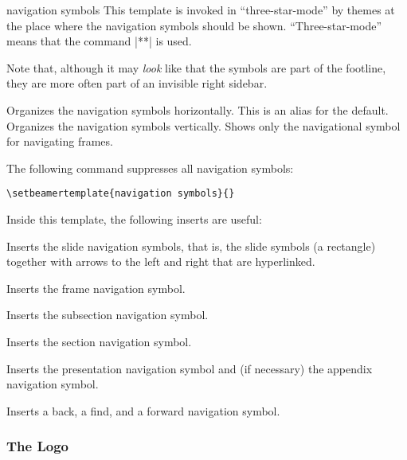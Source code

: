 \begin{element}{navigation symbols}\yes\yes\yes
  This template is invoked in ``three-star-mode'' by themes
  at the place where the navigation symbols should be
  shown. ``Three-star-mode'' means that the command
  |\usebeamertemplate***| is used.

  Note that, although it may \emph{look} like that the symbols are part of
  the footline, they are more often part of an invisible right
  sidebar.

  \begin{templateoptions}
    Organizes the navigation symbols horizontally.
    This is an alias for the default.
    Organizes the navigation symbols vertically.
    Shows only the navigational symbol for navigating frames.
  \end{templateoptions}

  \example The following command suppresses all navigation symbols:
\begin{verbatim}
\setbeamertemplate{navigation symbols}{}
\end{verbatim}

  Inside this template, the following inserts are useful:
  \begin{itemize}
    \iteminsert{\insertslidenavigationsymbol}
    Inserts the slide navigation symbols, that is, the slide symbols
    (a rectangle) together with arrows to the left and right that are
    hyperlinked.

    \iteminsert{\insertframenavigationsymbol}
    Inserts the frame navigation symbol.

    \iteminsert{\insertsubsectionnavigationsymbol}
    Inserts the subsection navigation symbol.

    \iteminsert{\insertsectionnavigationsymbol}
    Inserts the section navigation symbol.

    \iteminsert{\insertdocnavigationsymbol}
    Inserts the presentation navigation symbol and (if necessary) the
    appendix navigation symbol.

    \iteminsert{\insertbackfindforwardnavigationsymbol}
    Inserts a back, a find, and a forward navigation symbol.
  \end{itemize}
\end{element}






\subsubsection{The Logo}

